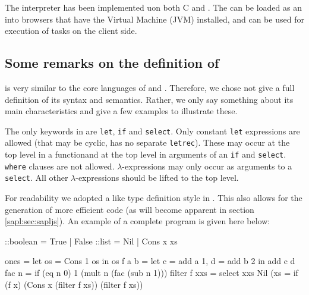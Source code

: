 The \Sapl interpreter has been implemented uon both \textsf{C} and \Java. The
\Java can be loaded as an into browsers that have the \Java Virtual Machine
(JVM) installed, and can be used for execution of \iTask tasks on the client
side.

\subsection{Some remarks on the definition of \Sapl}
\Sapl is very similar to the core languages of \Haskell and \Clean. 
Therefore, we chose not give a full definition of its syntax and semantics.
Rather, we only say something about its main characteristics and give a few
examples to illustrate these.

The only keywords in \Sapl are \texttt{let}, \texttt{if} and \texttt{select}.
Only constant \texttt{let} expressions are allowed (that may be cyclic, \Sapl
has no separate \texttt{letrec}). These may occur at the top level in a functionand at the top level in arguments of an \texttt{if} and \texttt{select}.
\texttt{where} clauses are not allowed. $\lambda$-expressions may only occur as 
arguments to a \texttt{select}. All other $\lambda$-expressions should be
lifted to the top level. 

For readability we adopted a \Clean like type definition style in \Sapl. This
also allows for the generation of more efficient code (as will become apparent
in section \ref{sapl:sec:sapljs}). An example of a complete \Sapl program is
given here below:

\begin{CleanCode}
::boolean    = True | False
::list       = Nil  | Cons x xs
 
ones         = let os = Cons 1 os
               in os 
f a b        = let c  = add a 1,
                   d  = add b 2
               in add c d
fac n        = if (eq n 0) 1
                           (mult n
                                 (fac (sub n 1)))
filter f xxs = select xxs Nil
                          (\x xs = if (f x) (Cons x
                                                  (filter f xs))
                                            (filter f xs))
\end{CleanCode}


